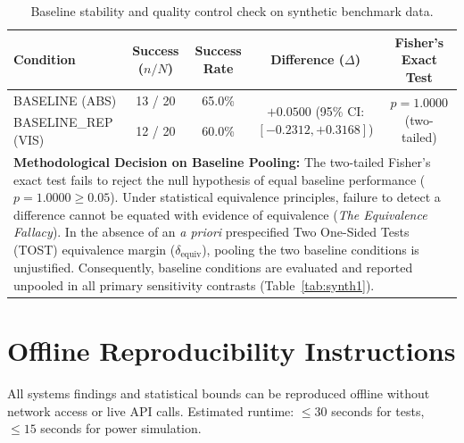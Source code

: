 \documentclass[conference]{IEEEtran}
\begin{document}
\begin{table}[ht]
\centering
\small
\caption{Baseline stability and quality control check on synthetic benchmark data.}
\label{tab:synth2}
\begin{tabular*}{\textwidth}{@{\extracolsep{\fill}}lcccc@{}}
\toprule
\textbf{Condition} & \textbf{Success ($n/N$)} & \textbf{Success Rate} & \textbf{Difference ($\Delta$)} & \textbf{Fisher's Exact Test} \\
\midrule
\textsc{BASELINE (ABS)}     & 13 / 20 & 65.0\% & \multirow{2}{*}{$+0.0500$ (95\% CI: $[-0.2312, +0.3168]$)} & \multirow{2}{*}{$p = 1.0000$ (two-tailed)} \\
\textsc{BASELINE\_REP (VIS)} & 12 / 20 & 60.0\% & & \\
\midrule
\multicolumn{5}{p{\dimexpr\textwidth-2\tabcolsep\relax}}{\textbf{Methodological Decision on Baseline Pooling:} The two-tailed Fisher's exact test fails to reject the null hypothesis of equal baseline performance ($p = 1.0000 \ge 0.05$). Under statistical equivalence principles, failure to detect a difference cannot be equated with evidence of equivalence (\textit{The Equivalence Fallacy}). In the absence of an \textit{a priori} prespecified Two One-Sided Tests (TOST) equivalence margin ($\delta_{\text{equiv}}$), pooling the two baseline conditions is unjustified. Consequently, baseline conditions are evaluated and reported unpooled in all primary sensitivity contrasts (Table~\ref{tab:synth1}).} \\
\bottomrule
\end{tabular*}
\end{table}

\FloatBarrier

\section{Offline Reproducibility Instructions}
\label{app:reproduce}

All systems findings and statistical bounds can be reproduced offline without network access or live API calls. Estimated runtime: $\leq 30$ seconds for tests, $\leq 15$ seconds for power simulation.
\end{document}
